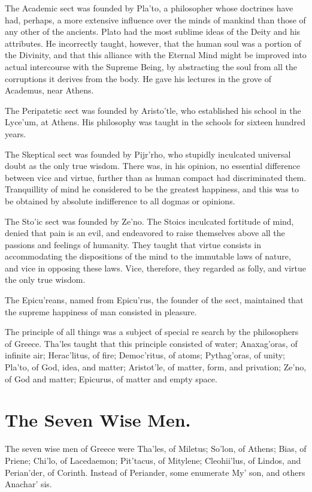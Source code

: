 \documentclass[openany,a4paper]{memoir}
\begin{document}
The Academic sect was founded by Pla'to, a philosopher 
whose doctrines have had, perhaps, a more extensive influence 
over the minds of mankind than those of any other of the 
ancients. Plato had the most sublime ideas of the Deity and 
his attributes. He incorrectly taught, however, that the 
human soul was a portion of the Divinity, and that this alliance with the Eternal Mind might be improved into actual 
intercourse with the Supreme Being, by abstracting the soul 
from all the corruptions it derives from the body. He gave 
his lectures in the grove of Academus, near Athens. 

The Peripatetic sect was founded by Aristo'tle, who established his school in the Lyce'um, at Athens. His philosophy was taught in the schools for sixteen hundred years. 

The Skeptical sect was founded by Pijr'rho, who stupidly 
inculcated universal doubt as the only true wisdom. There 
was, in his opinion, no essential difference between vice and 
virtue, further than as human compact had discriminated 
them. Tranquillity of mind he considered to be the greatest 
happiness, and this was to be obtained by absolute indifference to all dogmas or opinions. 

The Sto'ic sect was founded by Ze'no. The Stoics inculcated fortitude of mind, denied that pain is an evil, and endeavored to raise themselves above all the passions and 
feelings of humanity. They taught that virtue consists in 
accommodating the dispositions of the mind to the immutable laws of nature, and vice in opposing these laws. Vice, 
therefore, they regarded as folly, and virtue the only true 
wisdom. 

The Epicu'reans, named from Epicu'rus, the founder of 
the sect, maintained that the supreme happiness of man consisted in pleasure. 

The principle of all things was a subject of special re
search by the philosophers of Greece. Tha'les taught that 
this principle consisted of water; Anaxag'oras, of infinite 
air; Herac'litus, of fire; Democ'ritus, of atoms; Pythag'oras, of unity; Pla'to, of God, idea, and matter; Aristot'le, of 
matter, form, and privation; Ze'no, of God and matter; Epicurus, of matter and empty space. 

\section{The Seven Wise Men.}

The seven wise men of Greece 
were Tha'les, of Miletus; So'lon, of Athens; Bias, of Priene; Chi'lo, of Lacedaemon; Pit'tacus, of Mitylene; Cleohii'lus, of Lindos, and Perian'der, of Corinth. Instead of 
Periander, some enumerate My' son, and others Anachar' sis. 
\end{document}
